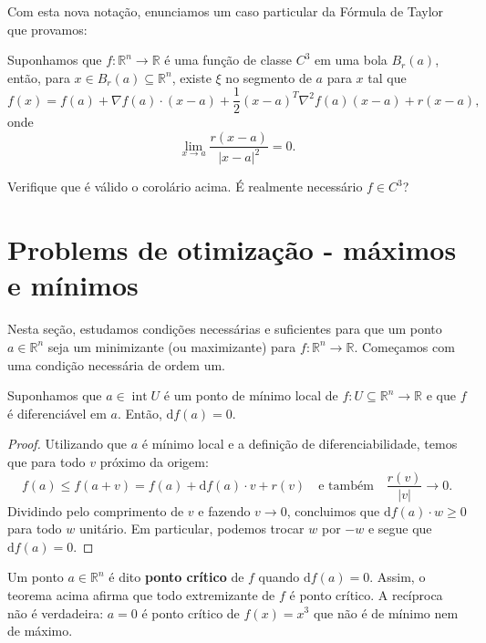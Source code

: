 Com esta nova notação, enunciamos um caso particular da Fórmula de Taylor que provamos:

\begin{corol}
	Suponhamos que $f: \mathbb{R}^n \to \mathbb{R}$ é uma função de classe $C^{3}$ em uma bola $B_r(a)$, então, para $x \in B_r(a) \subseteq \mathbb{R}^n$, existe $\xi$ no segmento de $a$ para $x$ tal que
	\begin{equation}
	f(x) = f(a) + \nabla f(a) \cdot (x-a) + \frac{1}{2} (x-a)^T \nabla^2 f (a) (x-a) + r(x-a),
	\end{equation} onde 
	\[
	\lim_{x\to a} \frac{r(x-a)}{|x-a|^2} = 0.
	\]
\end{corol}


\begin{exer}
	Verifique que é válido o corolário acima. É realmente necessário $f \in C^3$?
\end{exer}



\section{Problems de otimização - máximos e mínimos}


Nesta seção, estudamos condições necessárias e suficientes para que um ponto $a \in \mathbb{R}^n$ seja um minimizante (ou maximizante) para $f: \mathbb{R}^n \to \mathbb{R}$. Começamos com uma condição necessária de ordem um.

\begin{prop}
	Suponhamos que $a \in \operatorname{int} U$ é um ponto de mínimo local de $f: U \subseteq \mathbb{R}^n \to \mathbb{R}$ e que $f$ é diferenciável em $a$. Então, $\mathrm{d}  f(a) = 0$.
\end{prop}

\begin{proof}
	Utilizando que $a$ é mínimo local e a definição de diferenciabilidade, temos que para todo $v$ próximo da origem:
	\[
	f(a) \le f(a+v) = f(a) + \mathrm{d}  f(a) \cdot v + r(v) \quad \text{e também} \quad \frac{r(v)}{|v|} \to 0.
	\] Dividindo pelo comprimento de $v$ e fazendo $v \to 0$, concluimos que $\mathrm{d}  f(a) \cdot w \ge 0$ para todo $w$ unitário. Em particular, podemos trocar $w$ por $-w$ e segue que $\mathrm{d}  f(a) =0$.
\end{proof}

Um ponto $a \in \mathbb{R}^n$ é dito \textbf{ponto crítico} de $f$ quando $\mathrm{d}  f(a) = 0$. Assim, o teorema acima afirma que todo extremizante de $f$ é ponto crítico. A recíproca não é verdadeira: $a = 0$ é ponto crítico de $f(x) = x^3$ que não é de mínimo nem de máximo.


